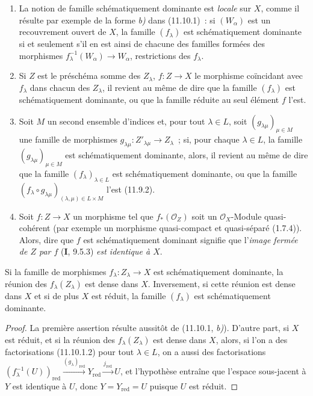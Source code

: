 \begin{remarks}[11.10.3]
\label{IV.11.10.3-fr}
\begin{enumerate}[label=(\roman*)]
  \item La notion de famille schématiquement dominante est \emph{locale} sur
  $X$, comme il résulte par exemple de la forme \emph{b)} dans (11.10.1)~: si
  $(W_\alpha)$ est un recouvrement ouvert de $X$, la famille $(f_\lambda)$ est
  schématiquement dominante si et seulement s'il en est ainsi de chacune des
  familles formées des morphismes
  $f_\lambda^{-1}(W_\alpha)\to W_\alpha$, restrictions des $f_\lambda$.
  \item Si $Z$ est le préschéma somme des $Z_\lambda$, $f:Z\to X$ le morphisme
  coïncidant avec $f_\lambda$ dans chacun des $Z_\lambda$, il revient au même
  de dire que la famille $(f_\lambda)$ est schématiquement dominante, ou que
  la famille réduite au seul élément $f$ l'est.
  \item Soit $M$ un second ensemble d'indices et, pour tout $\lambda\in L$,
  soit $(g_{\lambda\mu})_{\mu\in M}$ une famille de morphismes
  $g_{\lambda\mu}:Z'_{\lambda\mu}\to Z_\lambda$~; si, pour chaque
  $\lambda\in L$, la famille $(g_{\lambda\mu})_{\mu\in M}$ est
  schématiquement dominante, alors, il revient au même de dire que la famille
  $(f_\lambda)_{\lambda\in L}$ est schématiquement dominante, ou que la
  famille
  $(f_\lambda\circ g_{\lambda\mu})_{(\lambda,\mu)\in L\times M}$ l'est
  (11.9.2).
  \item Soit $f:Z\to X$ un morphisme tel que $f_*(\mathcal O_Z)$ soit un
  $\mathcal O_X$-Module quasi-cohérent (par exemple un morphisme quasi-compact
  et quasi-séparé (1.7.4)). Alors, dire que $f$ est schématiquement dominant
  signifie que l'\emph{image fermée de $Z$ par $f$} ($\mathbf I$, 9.5.3) \emph{est
  identique à $X$}.
\end{enumerate}
\end{remarks}

\begin{proposition}[11.10.4]
\label{IV.11.10.4-fr}
Si la famille de morphismes $f_\lambda:Z_\lambda\to X$ est schématiquement
dominante, la réunion des $f_\lambda(Z_\lambda)$ est dense dans $X$.
Inversement, si cette réunion est dense dans $X$ et si de plus $X$ est \textup{réduit},
la famille $(f_\lambda)$ est schématiquement dominante.
\end{proposition}

\begin{proof}
La première assertion résulte aussitôt de (11.10.1, \emph{b)}). D'autre part, si $X$
est réduit, et si la réunion des $f_\lambda(Z_\lambda)$ est dense dans $X$,
alors, si l'on a des factorisations (11.10.1.2) pour tout $\lambda\in L$, on a
aussi des factorisations
$(f_\lambda^{-1}(U))_{\mathrm{red}}
\xrightarrow{(g_\lambda)_{\mathrm{red}}}Y_{\mathrm{red}}
\xrightarrow{j_{\mathrm{red}}}U$,
et l'hypothèse entraîne que l'espace sous-jacent à $Y$ est identique à $U$,
donc $Y=Y_{\mathrm{red}}=U$ puisque $U$ est réduit.
\end{proof}

